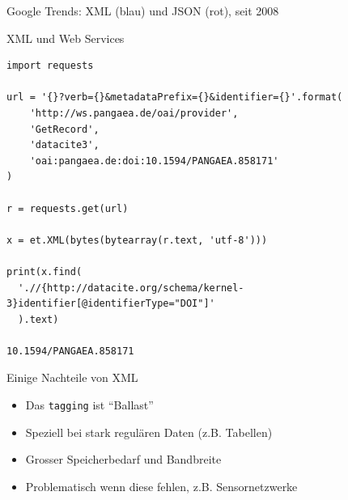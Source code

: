 \documentclass{beamer}
\begin{document}
{
	\begin{frame}[plain]
		\vspace{7cm}
		\begin{center}
Google Trends: XML (blau) und JSON (rot), seit 2008
		\end{center}
	\end{frame}
}

\begin{frame}[fragile]{XML und Web Services}
	
	\lstset{language=Python}
	\scriptsize
	\begin{lstlisting}
import requests
	
url = '{}?verb={}&metadataPrefix={}&identifier={}'.format(
	'http://ws.pangaea.de/oai/provider',
	'GetRecord', 
	'datacite3', 
	'oai:pangaea.de:doi:10.1594/PANGAEA.858171'
)
	
r = requests.get(url)
	
x = et.XML(bytes(bytearray(r.text, 'utf-8')))
	
print(x.find(
  './/{http://datacite.org/schema/kernel-3}identifier[@identifierType="DOI"]'
  ).text)
 
10.1594/PANGAEA.858171
	\end{lstlisting}
	
\end{frame}


\begin{frame}{Einige Nachteile von XML}
	
	\begin{itemize}
		\item Das \texttt{tagging} ist ``Ballast''
		\item Speziell bei stark regulären Daten (z.B. Tabellen) 
		\item Grosser Speicherbedarf und Bandbreite
		\item Problematisch wenn diese fehlen, z.B. Sensornetzwerke
	\end{itemize}
	
\end{frame}
\end{document}
